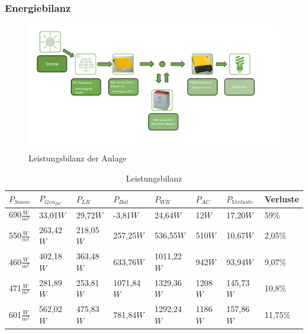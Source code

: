 \subsubsection{Energiebilanz}
\begin{figure}[!ht]
		\centering
		\includegraphics[width=\linewidth]{Abbildungen/Leistungsbilanz.png}
		\caption{Leistungsbilanz der Anlage}
		\label{fig:230512_Leistungsbilanz}
\end{figure}

\begin{table}[!ht]
\centering
\caption{Leistungsbilanz}
\renewcommand{\arraystretch}{1.5}
\begin{tabularx}{\textwidth}{|X|X|X|X|X|X|X|X|}
\hline
\rowcolor[HTML]{76B900} 
$P_{Sonne}$ & $P_{Gen_{DC}}$ & $P_{LR}$ & $P_{Bat}$ & $P_{WR}$ & $P_{AC}$ & $P_{Verluste}$ & Verluste \\ \hline
690$\frac{W}{m^2}$                              &  33,01$W$                & 29,72$W$          &   -3,81$W$            &   24,64$W$          & 12$W$              & 17,20$W$                  & 59\%    \\ \hline
550$\frac{W}{m^2}$                              & 263,42$W$               & 218,05$W$          &  257,25$W$           &  536,55$W$          & 510$W$             & 10,67$W$                  & 2,05\%    \\ \hline
460$\frac{W}{m^2}$                              & 402,18$W$               & 363,48$W$          &  633,76$W$           & 1011,22$W$         & 942$W$             & 93,94$W$                  & 9,07\%    \\ \hline
471$\frac{W}{m^2}$                              & 281,89$W$               & 253,81$W$         & 1071,84$W$          & 1329,36$W$         & 1208$W$            & 145,73$W$                 & 10,8\%    \\ \hline
601$\frac{W}{m^2}$                              & 562,02$W$                & 475,83$W$         &  781,84$W$           & 1292,24$W$         & 1186$W$            & 157,86$W$                  & 11,75\%    \\ \hline
\end{tabularx}
\label{tab:230514_Leistungsbilanz}
\end{table}



